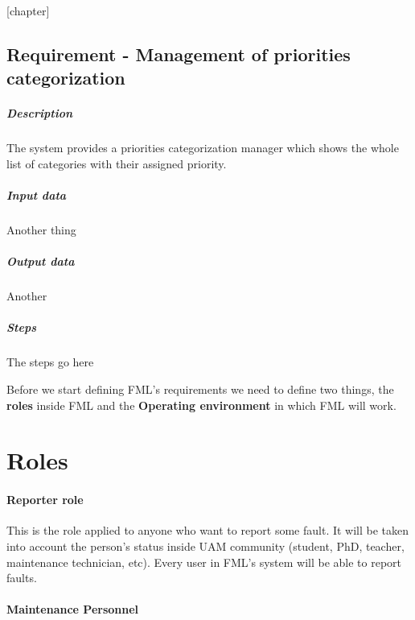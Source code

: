 
[chapter]
\newcommand{\header}[1]{\\ \indent \textbf{#1}\hspace{10pt}}

\newcommand{\reqvertsep}{\vspace{-7pt}}

\newcommand{\reqdesc}{\subparagraph{Description}}
\newcommand{\reqin}{\reqvertsep\subparagraph{Input data}}
\newcommand{\reqout}{\reqvertsep\subparagraph{Output data}}
\newcommand{\reqsteps}{\reqvertsep\subparagraph{Steps}}

\newenvironment{requirement}[1]{
	\subsection{Requirement  - #1}
}{\vspace{20pt}}

\begin{requirement}{Management of priorities categorization}
\reqdesc The system provides a priorities categorization manager which shows the whole list of categories with their assigned priority. 

\reqin Another thing

\reqout Another

\reqsteps The steps go here

\end{requirement}




Before we start defining FML's requirements we need to define two things, the \textbf{roles} inside FML and the \textbf{Operating environment} in which FML will work.


\label{chapRequirements}
\section{Roles}

\paragraph{Reporter role} \label{ReporterRole} This is the role applied to anyone who want to report some fault. It will be taken into account the person's status inside UAM community (student, PhD, teacher, maintenance technician, etc). Every user in FML's system will be able to report faults.

\paragraph{Maintenance Personnel} \label{MaintenancePersonnel}

